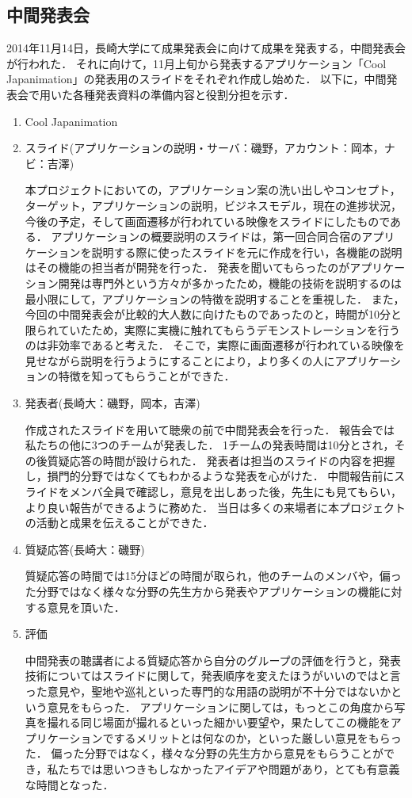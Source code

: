 \subsection{中間発表会} 
\par
2014年11月14日，長崎大学にて成果発表会に向けて成果を発表する，中間発表会が行われた．
それに向けて，11月上旬から発表するアプリケーション「Cool Japanimation」の発表用のスライドをそれぞれ作成し始めた．
以下に，中間発表会で用いた各種発表資料の準備内容と役割分担を示す．
\begin{enumerate}
\item Cool Japanimation　
\par
\item スライド(アプリケーションの説明・サーバ：磯野，アカウント：岡本，ナビ：吉澤) 
\par
本プロジェクトにおいての，アプリケーション案の洗い出しやコンセプト，ターゲット，アプリケーションの説明，ビジネスモデル，現在の進捗状況，今後の予定，そして画面遷移が行われている映像をスライドにしたものである．
アプリケーションの概要説明のスライドは，第一回合同合宿のアプリケーションを説明する際に使ったスライドを元に作成を行い，各機能の説明はその機能の担当者が開発を行った．
発表を聞いてもらったのがアプリケーション開発は専門外という方々が多かったため，機能の技術を説明するのは最小限にして，アプリケーションの特徴を説明することを重視した．
また，今回の中間発表会が比較的大人数に向けたものであったのと，時間が10分と限られていたため，実際に実機に触れてもらうデモンストレーションを行うのは非効率であると考えた．
そこで，実際に画面遷移が行われている映像を見せながら説明を行うようにすることにより，より多くの人にアプリケーションの特徴を知ってもらうことができた．
\item 発表者(長崎大：磯野，岡本，吉澤)
\par
作成されたスライドを用いて聴衆の前で中間発表会を行った．
報告会では私たちの他に3つのチームが発表した．
1チームの発表時間は10分とされ，その後質疑応答の時間が設けられた．
発表者は担当のスライドの内容を把握し，損門的分野ではなくてもわかるような発表を心がけた．
中間報告前にスライドをメンバ全員で確認し，意見を出しあった後，先生にも見てもらい，より良い報告ができるように務めた．
当日は多くの来場者に本プロジェクトの活動と成果を伝えることができた． 
\item 質疑応答(長崎大：磯野) 
\par
質疑応答の時間では15分ほどの時間が取られ，他のチームのメンバや，偏った分野ではなく様々な分野の先生方から発表やアプリケーションの機能に対する意見を頂いた． 
\item 評価 
\par
中間発表の聴講者による質疑応答から自分のグループの評価を行うと，発表技術についてはスライドに関して，発表順序を変えたほうがいいのではと言った意見や，聖地や巡礼といった専門的な用語の説明が不十分ではないかという意見をもらった．
アプリケーションに関しては，もっとこの角度から写真を撮れる同じ場面が撮れるといった細かい要望や，果たしてこの機能をアプリケーションでするメリットとは何なのか，といった厳しい意見をもらった．
偏った分野ではなく，様々な分野の先生方から意見をもらうことができ，私たちでは思いつきもしなかったアイデアや問題があり，とても有意義な時間となった．
\end{enumerate}　
\par
{}
